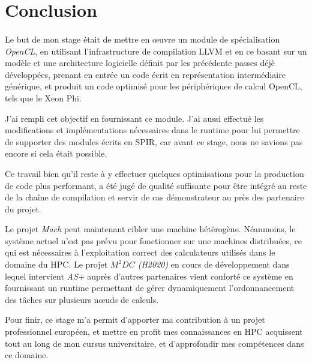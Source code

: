 \section{Conclusion}
\paragraph{}
Le but de mon stage était de mettre en \oe{}uvre un module de spécialisation
\emph{OpenCL}, en utilisant l'infrastructure de compilation LLVM et en ce basant
sur un modèle et une architecture logicielle définit par les précédente
passes déjè développées, prenant en entrée un code écrit en représentation
intermédiaire générique, et produit un code optimisé pour les périphériques de
calcul OpenCL, tels que le Xeon Phi.

J’ai rempli cet objectif en fournissant ce module. J'ai aussi effectué les
modifications et implémentations nécessaires dans le runtime pour lui permettre
de supporter des modules écrits en SPIR, car avant ce stage, nous ne savions pas
encore si cela était possible.

Ce travail bien qu'il reste à y effectuer quelques optimisations pour la
production de code plus performant, a été jugé de qualité suffisante pour être
intégré au reste de la chaîne de compilation et servir de cas démonstrateur au
près des partenaire du projet.

Le projet \emph{Mach} peut maintenant cibler une machine hétérogène. Néanmoins,
le système actuel n'est pas prévu pour fonctionner sur une machines distribuées,
ce qui est nécessaires à l'exploitation correct des calculateurs utilisés dans
le domaine du HPC. Le projet \emph{$M^2DC$ (H2020)} en cours de développement dans
lequel intervient \emph{AS+} auprès d'autres partenaires vient conforté ce
système en fournissant un runtime permettant de gérer dynamiquement
l'ordonnancement des tâches sur plusieurs n\oe{}uds de calculs.

Pour finir, ce stage m'a permit d'apporter ma contribution à un projet
professionnel européen, et mettre en profit mes connaissances en HPC acquissent
tout au long de mon cursus universitaire, et d'approfondir mes compétences dans
ce domaine.
